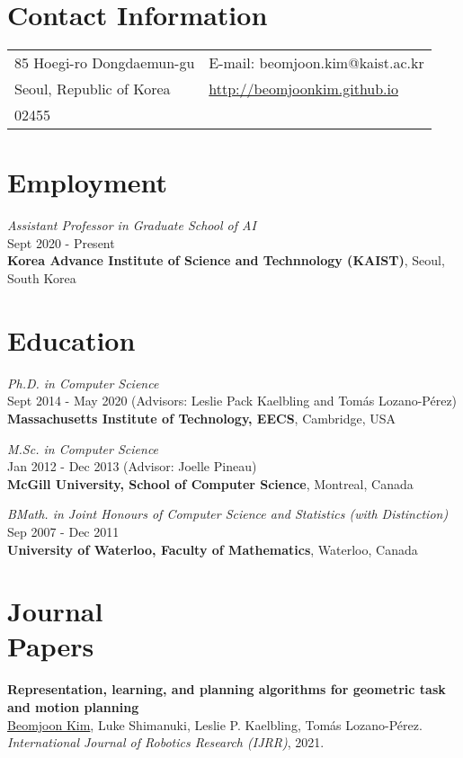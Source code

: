 \documentclass[line,margin,letterpaper]{res}
\begin{document}
\newcommand{\sth}[0]{$^{\textrm{th}}$ }



\begin{resume}
\section{Contact Information}
\hspace{-10px}
\begin{tabular}{ll}
85 Hoegi-ro Dongdaemun-gu & E-mail: beomjoon.kim@kaist.ac.kr\\
Seoul, Republic of Korea& \small{\url{http://beomjoonkim.github.io}}\\
02455 & \\
\end{tabular}

\section{Employment}
{\sl Assistant Professor in Graduate School of AI} \\Sept 2020 - Present \\
\textbf{Korea Advance Institute of Science and Technnology (KAIST)}, Seoul, South Korea


\section{Education}
{\sl Ph.D. in Computer Science} \\Sept 2014 - May 2020 (Advisors: Leslie Pack Kaelbling
and Tom\'as Lozano-P\'erez)\\
\textbf{Massachusetts Institute of Technology, EECS}, Cambridge, USA


{\sl M.Sc. in Computer Science} \\Jan 2012 - Dec 2013 (Advisor: Joelle Pineau)\\
\textbf{McGill University, School of Computer Science}, Montreal, Canada

{\sl BMath. in Joint Honours of Computer Science and Statistics (with Distinction)} \\Sep 2007 - Dec 2011\\
\textbf{University of Waterloo, Faculty of Mathematics}, Waterloo, Canada

\section{Journal\\ Papers}
\textbf{Representation, learning, and planning algorithms for geometric task and motion planning}\\
\underline{Beomjoon Kim}, Luke Shimanuki, Leslie P. Kaelbling, Tom\'as Lozano-P\'erez.\\
{\sl International Journal of Robotics Research (IJRR)}, 2021.


\end{resume}
\end{document}
